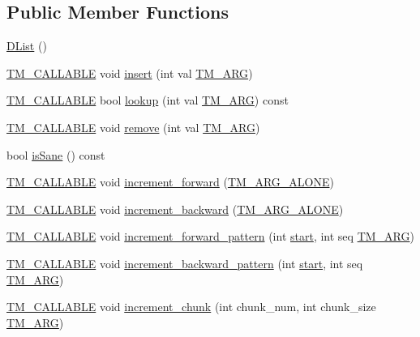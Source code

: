 \subsection*{Public Member Functions}
\begin{DoxyCompactItemize}
\item 
\hyperlink{classDList_a0f2860f210505acb032ddc2a779f85a3}{D\-List} ()
\item 
\hyperlink{tm_8h_adf0341d9b0d169f1aba20257caed702e}{T\-M\-\_\-\-C\-A\-L\-L\-A\-B\-L\-E} void \hyperlink{classDList_aee38e39d36c976cbde2c74a2a845f1dd}{insert} (int val \hyperlink{tm_8h_a030f4350a175fed7a99c242cbaa53258}{T\-M\-\_\-\-A\-R\-G})
\item 
\hyperlink{tm_8h_adf0341d9b0d169f1aba20257caed702e}{T\-M\-\_\-\-C\-A\-L\-L\-A\-B\-L\-E} bool \hyperlink{classDList_a1bbdbfa44979c867da332f3a97c9942d}{lookup} (int val \hyperlink{tm_8h_a030f4350a175fed7a99c242cbaa53258}{T\-M\-\_\-\-A\-R\-G}) const 
\item 
\hyperlink{tm_8h_adf0341d9b0d169f1aba20257caed702e}{T\-M\-\_\-\-C\-A\-L\-L\-A\-B\-L\-E} void \hyperlink{classDList_ac998269d8b5bd4ac9ee393e3a3f20ec3}{remove} (int val \hyperlink{tm_8h_a030f4350a175fed7a99c242cbaa53258}{T\-M\-\_\-\-A\-R\-G})
\item 
bool \hyperlink{classDList_a3d026313a47711da4d6cf3d637747457}{is\-Sane} () const 
\item 
\hyperlink{tm_8h_adf0341d9b0d169f1aba20257caed702e}{T\-M\-\_\-\-C\-A\-L\-L\-A\-B\-L\-E} void \hyperlink{classDList_a4f2f83d67c2fab2f23ecf5e31f376494}{increment\-\_\-forward} (\hyperlink{tm_8h_a5f5ab8a008b9734c5378be81bcb3639e}{T\-M\-\_\-\-A\-R\-G\-\_\-\-A\-L\-O\-N\-E})
\item 
\hyperlink{tm_8h_adf0341d9b0d169f1aba20257caed702e}{T\-M\-\_\-\-C\-A\-L\-L\-A\-B\-L\-E} void \hyperlink{classDList_a7268e5953aacd61a7ac839f7886cb1a5}{increment\-\_\-backward} (\hyperlink{tm_8h_a5f5ab8a008b9734c5378be81bcb3639e}{T\-M\-\_\-\-A\-R\-G\-\_\-\-A\-L\-O\-N\-E})
\item 
\hyperlink{tm_8h_adf0341d9b0d169f1aba20257caed702e}{T\-M\-\_\-\-C\-A\-L\-L\-A\-B\-L\-E} void \hyperlink{classDList_ae60ec7241aa350516088c1680561e00d}{increment\-\_\-forward\-\_\-pattern} (int \hyperlink{avltree_8c_aef0786e63ba14dfdb6d8632333208422}{start}, int seq \hyperlink{tm_8h_a030f4350a175fed7a99c242cbaa53258}{T\-M\-\_\-\-A\-R\-G})
\item 
\hyperlink{tm_8h_adf0341d9b0d169f1aba20257caed702e}{T\-M\-\_\-\-C\-A\-L\-L\-A\-B\-L\-E} void \hyperlink{classDList_a43a32781dca806a63eceb4093373c90f}{increment\-\_\-backward\-\_\-pattern} (int \hyperlink{avltree_8c_aef0786e63ba14dfdb6d8632333208422}{start}, int seq \hyperlink{tm_8h_a030f4350a175fed7a99c242cbaa53258}{T\-M\-\_\-\-A\-R\-G})
\item 
\hyperlink{tm_8h_adf0341d9b0d169f1aba20257caed702e}{T\-M\-\_\-\-C\-A\-L\-L\-A\-B\-L\-E} void \hyperlink{classDList_a1f7895399b0057c9038f343d63117637}{increment\-\_\-chunk} (int chunk\-\_\-num, int chunk\-\_\-size \hyperlink{tm_8h_a030f4350a175fed7a99c242cbaa53258}{T\-M\-\_\-\-A\-R\-G})
\end{DoxyCompactItemize}
